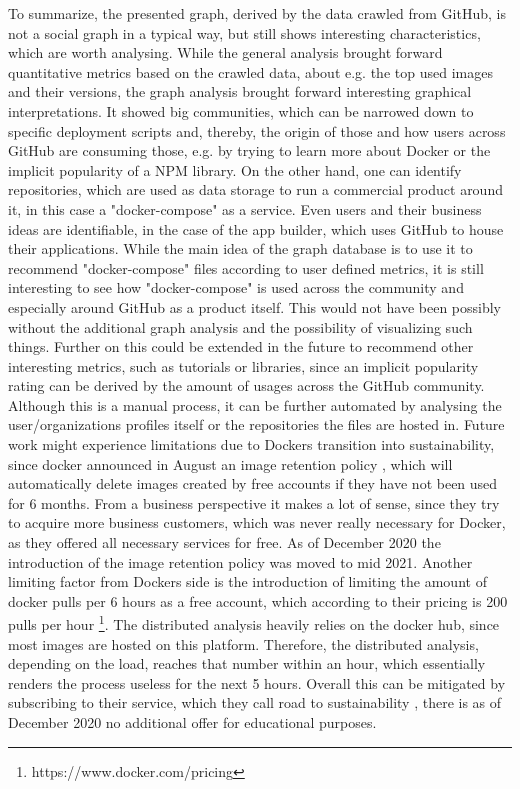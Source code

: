 To summarize, the presented graph, derived by the data crawled from GitHub, is not a social graph in a typical way, but still shows interesting characteristics, which are worth analysing. While the general analysis brought forward quantitative metrics based on the crawled data, about e.g. the top used images and their versions, the graph analysis brought forward interesting graphical interpretations. It showed big communities, which can be narrowed down to specific deployment scripts and, thereby, the origin of those and how users across GitHub are consuming those, e.g. by trying to learn more about Docker or the implicit popularity of a NPM library. On the other hand, one can identify repositories, which are used as data storage to run a commercial product around it, in this case a "docker-compose" as a service. Even users and their business ideas are identifiable, in the case of the app builder, which uses GitHub to house their applications. While the main idea of the graph database is to use it to recommend "docker-compose" files according to user defined metrics, it is still interesting to see how "docker-compose" is used across the community and especially around GitHub as a product itself. This would not have been possibly without the additional graph analysis and the possibility of visualizing such things. Further on this could be extended in the future to recommend other interesting metrics, such as tutorials or libraries, since an implicit popularity rating can be derived by the amount of usages across the GitHub community. Although this is a manual process, it can be further automated by analysing the user/organizations profiles itself or the repositories the files are hosted in.
Future work might experience limitations due to Dockers transition into sustainability, since docker announced in August an image retention policy , which will automatically delete images created by free accounts if they have not been used for 6 months. From a business perspective it makes a lot of sense, since they try to acquire more business customers, which was never really necessary for Docker, as they offered all necessary services for free. As of December 2020 the introduction of the image retention policy was moved to mid 2021. Another limiting factor from Dockers side is the introduction of limiting the amount of docker pulls per 6 hours as a free account, which according to their pricing is 200 pulls per hour \footnote{https://www.docker.com/pricing}. The distributed analysis heavily relies on the docker hub, since most images are hosted on this platform. Therefore, the distributed analysis, depending on the load, reaches that number within an hour, which essentially renders the process useless for the next 5 hours. Overall this can be mitigated by subscribing to their service, which they call road to sustainability , there is as of December 2020 no additional offer for educational purposes.
